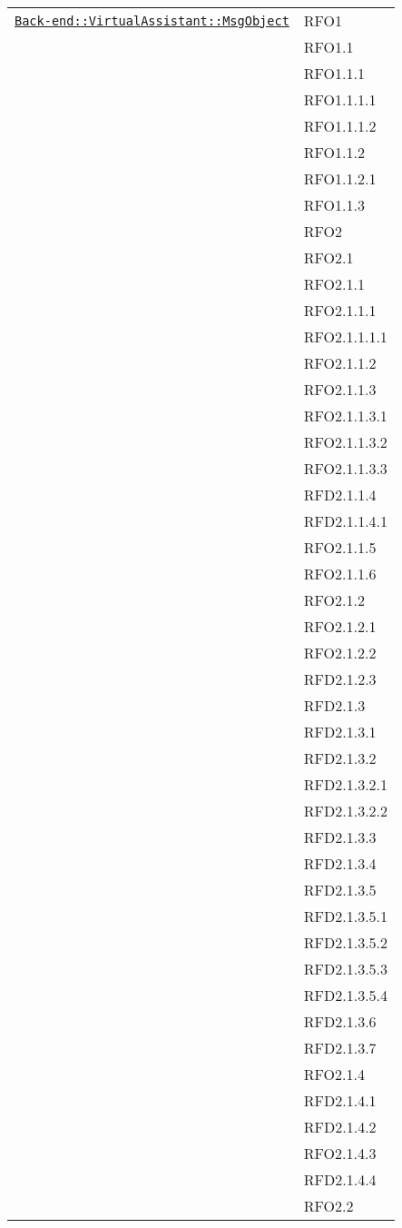 \begin{longtable}{|>{\centering}m{10cm}|m{3cm}<{\centering}|}
\hyperref[Back-end::VirtualAssistant::MsgObject]{\texttt{Back-end::VirtualAssistant::MsgObject}} & RFO1\\
& RFO1.1\\
& RFO1.1.1\\
& RFO1.1.1.1\\
& RFO1.1.1.2\\
& RFO1.1.2\\
& RFO1.1.2.1\\
& RFO1.1.3\\
& RFO2\\
& RFO2.1\\
& RFO2.1.1\\
& RFO2.1.1.1\\
& RFO2.1.1.1.1\\
& RFO2.1.1.2\\
& RFO2.1.1.3\\
& RFO2.1.1.3.1\\
& RFO2.1.1.3.2\\
& RFO2.1.1.3.3\\
& RFD2.1.1.4\\
& RFD2.1.1.4.1\\
& RFO2.1.1.5\\
& RFO2.1.1.6\\
& RFO2.1.2\\
& RFO2.1.2.1\\
& RFO2.1.2.2\\
& RFD2.1.2.3\\
& RFD2.1.3\\
& RFD2.1.3.1\\
& RFD2.1.3.2\\
& RFD2.1.3.2.1\\
& RFD2.1.3.2.2\\
& RFD2.1.3.3\\
& RFD2.1.3.4\\
& RFD2.1.3.5\\
& RFD2.1.3.5.1\\
& RFD2.1.3.5.2\\
& RFD2.1.3.5.3\\
& RFD2.1.3.5.4\\
& RFD2.1.3.6\\
& RFD2.1.3.7\\
& RFO2.1.4\\
& RFD2.1.4.1\\
& RFD2.1.4.2\\
& RFO2.1.4.3\\
& RFD2.1.4.4\\
& RFO2.2\\

\end{longtable}
